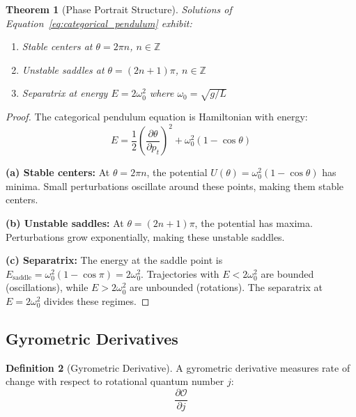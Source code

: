 \documentclass[11pt,twocolumn,a4paper]{article}
\newtheorem{theorem}{Theorem}[section]
\theoremstyle{definition}
\newtheorem{definition}[theorem]{Definition}
\theoremstyle{remark}
\newcommand{\ZZ}{\mathbb{Z}}
\begin{document}
\begin{theorem}[Phase Portrait Structure]
\label{thm:phase_portrait}
Solutions of Equation~\eqref{eq:categorical_pendulum} exhibit:
\begin{enumerate}[label=(\alph*)]
\item Stable centers at $\theta = 2\pi n$, $n \in \ZZ$
\item Unstable saddles at $\theta = (2n+1)\pi$, $n \in \ZZ$
\item Separatrix at energy $E = 2\omega_0^2$ where $\omega_0 = \sqrt{g/L}$
\end{enumerate}
\end{theorem}

\begin{proof}
The categorical pendulum equation is Hamiltonian with energy:
\begin{equation}
E = \frac{1}{2}\left(\frac{\partial\theta}{\partial p_t}\right)^2 + \omega_0^2(1 - \cos\theta)
\label{eq:pendulum_energy}
\end{equation}

\textbf{(a) Stable centers:} At $\theta = 2\pi n$, the potential $U(\theta) = \omega_0^2(1-\cos\theta)$ has minima. Small perturbations oscillate around these points, making them stable centers.

\textbf{(b) Unstable saddles:} At $\theta = (2n+1)\pi$, the potential has maxima. Perturbations grow exponentially, making these unstable saddles.

\textbf{(c) Separatrix:} The energy at the saddle point is $E_{\mathrm{saddle}} = \omega_0^2(1-\cos\pi) = 2\omega_0^2$. Trajectories with $E < 2\omega_0^2$ are bounded (oscillations), while $E > 2\omega_0^2$ are unbounded (rotations). The separatrix at $E = 2\omega_0^2$ divides these regimes.
\end{proof}

\subsection{Gyrometric Derivatives}

\begin{definition}[Gyrometric Derivative]
\label{def:gyrometric_derivative}
A gyrometric derivative measures rate of change with respect to rotational quantum number $j$:
\begin{equation}
\frac{\partial \mathcal{O}}{\partial j}
\label{eq:gyrometric_derivative}
\end{equation}
\end{definition}
\end{document}
